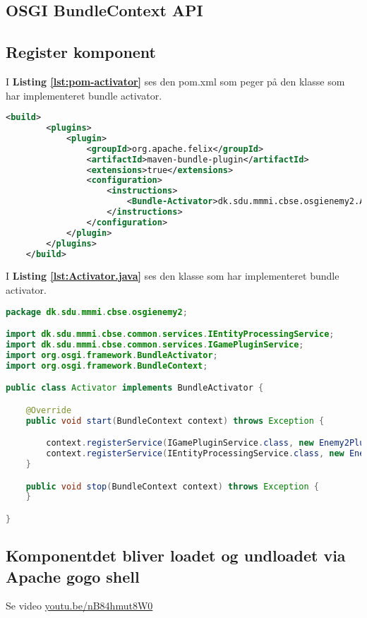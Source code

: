 \newpage
\subsection{OSGI BundleContext API}


\subsection{Register komponent}

I \textbf{Listing \ref{lst:pom-activator}} ses den pom.xml som peger på den
klasse som har implementeret bundle activator.

\begin{lstlisting}[caption={pom.xml}, label={lst:pom-activator}, language=xml]
    <build>
        <plugins>
            <plugin>
                <groupId>org.apache.felix</groupId>
                <artifactId>maven-bundle-plugin</artifactId>
                <extensions>true</extensions>
                <configuration>
                    <instructions>
                        <Bundle-Activator>dk.sdu.mmmi.cbse.osgienemy2.Activator</Bundle-Activator>
                    </instructions>
                </configuration>
            </plugin>
        </plugins>
    </build>
\end{lstlisting}


I \textbf{Listing \ref{lst:Activator.java}} ses den klasse som har implementeret
bundle activator.

\begin{lstlisting}[caption={Activator.java}, label={lst:Activator.java}, language=java]
package dk.sdu.mmmi.cbse.osgienemy2;

import dk.sdu.mmmi.cbse.common.services.IEntityProcessingService;
import dk.sdu.mmmi.cbse.common.services.IGamePluginService;
import org.osgi.framework.BundleActivator;
import org.osgi.framework.BundleContext;

public class Activator implements BundleActivator {

    @Override
    public void start(BundleContext context) throws Exception {

        context.registerService(IGamePluginService.class, new Enemy2Plugin(), null);
        context.registerService(IEntityProcessingService.class, new Enemy2Processor(), null);
    }

    public void stop(BundleContext context) throws Exception {
    }

}
\end{lstlisting}





\subsection{Komponentdet bliver loadet og undloadet via Apache gogo shell}
Se video \href{https://www.youtube.com/watch?v=nB84hmut8W0}{youtu.be/nB84hmut8W0}

